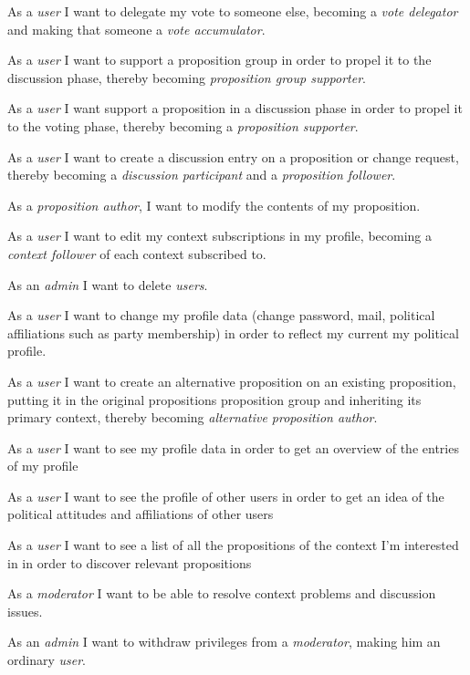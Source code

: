 As a \textit{user} I want to delegate my vote to someone else, becoming a \textit{vote delegator} and making that someone a \textit{vote accumulator}.

As a \textit{user} I want to support a proposition group in order to propel it to the discussion phase, thereby becoming \textit{proposition group supporter}.

 As a \textit{user} I want support a proposition in a discussion phase in order to propel it to the voting phase, thereby becoming a \textit{proposition supporter}.

 As a \textit{user} I want to create a discussion entry on a proposition or change request, thereby becoming a \textit{discussion participant} and a \textit{proposition follower}.

 As a \textit{proposition author}, I want to modify the contents of my proposition.

 As a \textit{user} I want to edit my context subscriptions in my profile, becoming a \textit{context follower} of each context subscribed to.

 As an \textit{admin} I want to delete \textit{users}.

 As a \textit{user} I want to change my profile data (change password, mail, political affiliations such as party membership) in order to reflect my current my political profile.
 
 As a \textit{user} I want to create an alternative proposition on an existing proposition, putting it in the original propositions proposition group and inheriting its primary context, thereby becoming \textit{alternative proposition author}.

 As a \textit{user} I want to see my profile data in order to get an overview of the entries of my profile

 As a \textit{user} I want to see the profile of other users in order to get an idea of the political attitudes and affiliations of other users

 As a \textit{user} I want to see a list of all the propositions of the context I’m interested in in order to discover relevant propositions

 As a \textit{moderator} I want to be able to resolve context problems and discussion issues.

 As an \textit{admin} I want to withdraw privileges from a \textit{moderator}, making him an ordinary \textit{user}.

